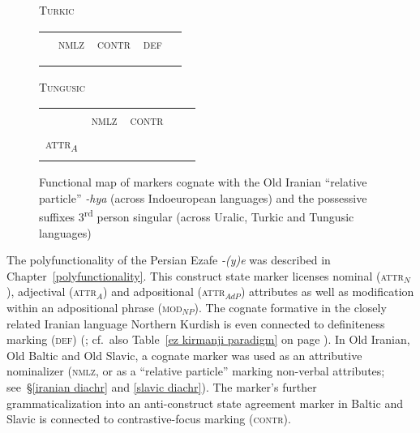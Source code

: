 {\begin{figure}[htbp]
\parbox[b]{0.5\textwidth}{
\begin{center}\textsc{Turkic}\\
\medskip
\begin{tabular}{| c || c | c | c | c}
\cline{1-1}
\\
\cline{1-1}
\\
\hline
 & \textsc{nmlz} & \textsc{contr} & \textsc{def}\\
\hline
\\
\cline{1-1}
\\
\cline{1-1}
\end{tabular}
\end{center}
}
\parbox[b]{0.5\textwidth}{
\begin{center}\textsc{Tungusic}\\
\medskip
\begin{tabular}{| c || c | c | c | c}
\cline{1-1}
\\
\cline{1-1}
\\
\hline
 & \textsc{nmlz} & \textsc{contr} & \\
\hline
\textsc{attr}$_{A}$\\
\cline{1-1}
\\
\cline{1-1}
\end{tabular}
\end{center}
}
\caption[Functional map of cognate devices]{Functional map of markers cognate with the Old Iranian “relative particle” \textit{-hya} (across Indoeuropean languages) and the possessive suffixes 3\textsuperscript{rd} person singular (across Uralic, Turkic and Tungusic languages)}
\label{ie-ural funcmap}
\end{figure}
The polyfunctionality of the Persian Ezafe \textit{-(y)e} was described in Chapter~\ref{polyfunctionality}. This construct state marker licenses nominal (\textsc{attr}$_{N}$), adjectival (\textsc{attr}$_{A}$) and adpositional (\textsc{attr}$_{AdP}$) attributes as well as modification within an adpositional phrase (\textsc{mod}$_{NP}$). The cognate formative in the closely related Iranian language Northern Kurdish  is even connected to definiteness marking (\textsc{def}) (\citealt{schroder2002}; cf.~also Table~\ref{ez kirmanji paradigm} on page \pageref{ez kirmanji paradigm}). In Old Iranian, Old Baltic and Old Slavic, a cognate marker was used as an attributive nominalizer (\textsc{nmlz}, or as a “relative particle” marking non-verbal attributes; see~\S\ref{iranian diachr} and \ref{slavic diachr}). The marker's further grammaticalization into an anti-construct state agreement marker in Baltic and Slavic is connected to contrastive-focus marking (\textsc{contr}).

}
